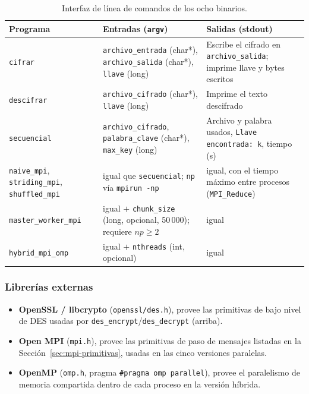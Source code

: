 \documentclass[11pt,letterpaper]{article}
\begin{document}
\begin{table}[H]
\centering
\small
\begin{tabular}{p{3.3cm}p{5.6cm}p{5.0cm}}
\toprule
\textbf{Programa} & \textbf{Entradas (\texttt{argv})} & \textbf{Salidas (stdout)} \\
\midrule
\texttt{cifrar} & \texttt{archivo\_entrada} (char*), \texttt{archivo\_salida} (char*), \texttt{llave} (long) & Escribe el cifrado en \texttt{archivo\_salida}; imprime llave y bytes escritos \\
\texttt{descifrar} & \texttt{archivo\_cifrado} (char*), \texttt{llave} (long) & Imprime el texto descifrado \\
\texttt{secuencial} & \texttt{archivo\_cifrado}, \texttt{palabra\_clave} (char*), \texttt{max\_key} (long) & Archivo y palabra usados, \texttt{Llave encontrada: k}, tiempo (s) \\
\texttt{naive\_mpi}, \texttt{striding\_mpi}, \texttt{shuffled\_mpi} & igual que \texttt{secuencial}; \texttt{np} vía \texttt{mpirun -np} & igual, con el tiempo máximo entre procesos (\texttt{MPI\_Reduce}) \\
\texttt{master\_worker\_mpi} & igual $+$ \texttt{chunk\_size} (long, opcional, 50\,000); requiere $np\ge2$ & igual \\
\texttt{hybrid\_mpi\_omp} & igual $+$ \texttt{nthreads} (int, opcional) & igual \\
\bottomrule
\end{tabular}
\caption{Interfaz de línea de comandos de los ocho binarios.}
\end{table}

\subsubsection*{Librerías externas}
\begin{itemize}[nosep]
    \item \textbf{OpenSSL / libcrypto} (\texttt{openssl/des.h}), provee las primitivas de bajo nivel de DES usadas por \texttt{des\_encrypt}/\texttt{des\_decrypt} (arriba).
    \item \textbf{Open MPI} (\texttt{mpi.h}), provee las primitivas de paso de mensajes listadas en la Sección~\ref{sec:mpi-primitivas}, usadas en las cinco versiones paralelas.
    \item \textbf{OpenMP} (\texttt{omp.h}, pragma \texttt{\#pragma omp parallel}), provee el paralelismo de memoria compartida dentro de cada proceso en la versión híbrida.
\end{itemize}
\end{document}
